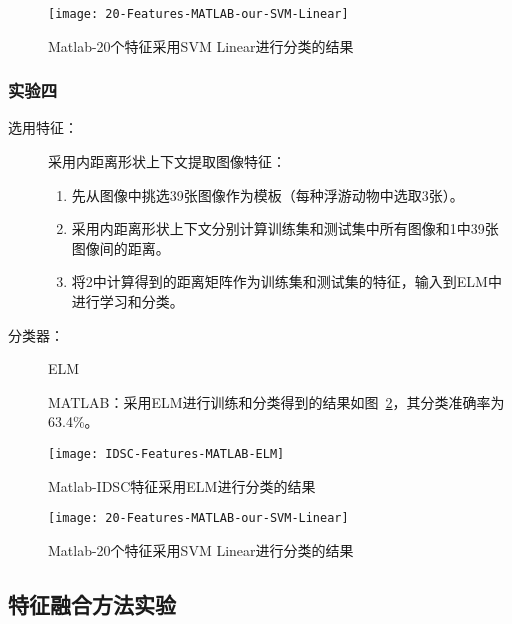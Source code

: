 \begin{figure}[!ht]
\centering
\texttt{[image: 20-Features-MATLAB-our-SVM-Linear]}
\caption{Matlab-20个特征采用SVM Linear进行分类的结果}
\label{fig:20-Features-MATLAB-our-SVM-Linear}
\end{figure}

\subsubsection{实验四}
\label{shiyan4}
\begin{description}
\item[选用特征：] 采用内距离形状上下文提取图像特征：
    \begin{enumerate}
    \item 先从图像中挑选39张图像作为模板（每种浮游动物中选取3张）。
    \item 采用内距离形状上下文分别计算训练集和测试集中所有图像和1中39张图像间的距离。
    \item 将2中计算得到的距离矩阵作为训练集和测试集的特征，输入到ELM中进行学习和分类。
    \end{enumerate}
\item[分类器：] ELM

MATLAB：采用ELM进行训练和分类得到的结果如图~\ref{fig:IDSC-Features-MATLAB-ELM}，其分类准确率为63.4\%。
\end{description}
\begin{figure}[!ht]
\centering
\texttt{[image: IDSC-Features-MATLAB-ELM]}
\caption{Matlab-IDSC特征采用ELM进行分类的结果}
\label{fig:IDSC-Features-MATLAB-ELM}
\end{figure}

\begin{figure}[!ht]
\centering
\texttt{[image: 20-Features-MATLAB-our-SVM-Linear]}
\caption{Matlab-20个特征采用SVM Linear进行分类的结果}
\label{fig:20-Features-MATLAB-our-SVM-Linear}
\end{figure}


\subsection{特征融合方法实验}
